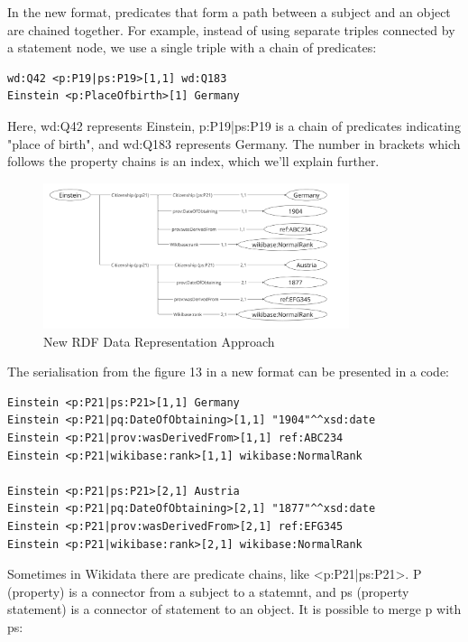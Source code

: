 In the new format, predicates that form a path between a subject and an object are chained together. For example, instead of using separate triples connected by a statement node, we use a single triple with a chain of predicates:

{\footnotesize
\begin{verbatim}
wd:Q42 <p:P19|ps:P19>[1,1] wd:Q183
Einstein <p:PlaceOfbirth>[1] Germany
\end{verbatim}
}

Here, wd:Q42 represents Einstein, p:P19|ps:P19 is a chain of predicates indicating "place of birth", and wd:Q183 represents Germany. The number in brackets which follows the property chains is an index, which we'll explain further.

\begin{figure}[htbp]
    \centering
    \includegraphics[width=0.8\textwidth]{13.png}
    \caption{New RDF Data Representation Approach}
    \label{fig:image13}
\end{figure}

The serialisation from the figure 13 in a new format can be presented in a code:

{\footnotesize
\begin{verbatim}
Einstein <p:P21|ps:P21>[1,1] Germany
Einstein <p:P21|pq:DateOfObtaining>[1,1] "1904"^^xsd:date
Einstein <p:P21|prov:wasDerivedFrom>[1,1] ref:ABC234
Einstein <p:P21|wikibase:rank>[1,1] wikibase:NormalRank

Einstein <p:P21|ps:P21>[2,1] Austria
Einstein <p:P21|pq:DateOfObtaining>[2,1] "1877"^^xsd:date
Einstein <p:P21|prov:wasDerivedFrom>[2,1] ref:EFG345
Einstein <p:P21|wikibase:rank>[2,1] wikibase:NormalRank
\end{verbatim}
}

Sometimes in Wikidata there are predicate chains, like <p:P21|ps:P21>. P (property) is a connector from a subject to a statemnt, and ps (property statement) is a connector of statement to an object. It is possible to merge p with ps:

